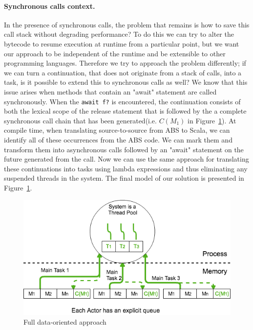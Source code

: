  

\paragraph{Synchronous calls context.}

In the presence of synchronous calls, the problem that remains is how to save this call stack without degrading performance? To do this we can try to alter the bytecode to resume execution at runtime from a particular point, but we want our approach to be independent of the runtime and be extensible to other programming languages. Therefore we try to approach the problem differently; if we can turn a continuation, that does not originate from a stack of calls, into a task, is it possible to extend this to synchronous calls as well? We know that this issue arises when methods that contain an "await" statement are called synchronously. When the \texttt{await f?} is encountered, the continuation consists of both the lexical scope of the release statement that is followed by the a complete synchronous call chain that has been generated(i.e. $C(M_1)$ in Figure~\ref{sol}). At compile time, when translating source-to-source from ABS to Scala, we can identify all of these occurrences from the ABS code. We can mark them and transform them into asynchronous calls followed by an "await" statement on the future generated from the call. Now we can use the same approach for translating these continuations into tasks using lambda expressions and thus eliminating any suspended threads in the system. The final model of our solution is presented in Figure~\ref{sol}. 
\begin{figure}
	\centering
	\includegraphics[scale=0.45]{solution.png}
	\caption{Full data-oriented approach}
	\label{sol}
\end{figure}

